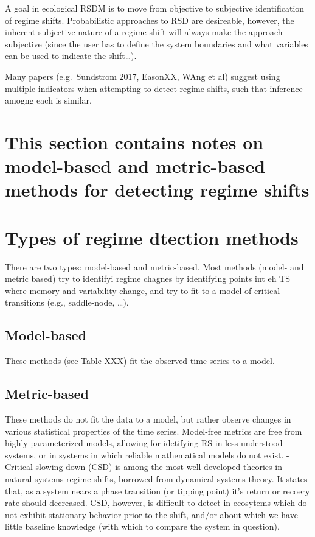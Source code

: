 \documentclass[12pt,twoside,openany]{reedthesis}
\begin{document}
A goal in ecological RSDM is to move from objective to subjective identification of regime shifts. Probabilistic approaches to RSD are desireable, however, the inherent subjective nature of a regime shift will always make the approach subjective (since the user has to define the system boundaries and what variables can be used to indicate the shift\ldots{}).

Many papers (e.g.~Sundstrom 2017, EasonXX, WAng et al) suggest using multiple indicators when attempting to detect regime shifts, such that inference amogng each is similar.

\hypertarget{this-section-contains-notes-on-model-based-and-metric-based-methods-for-detecting-regime-shifts}{%
\section{This section contains notes on model-based and metric-based methods for detecting regime shifts}\label{this-section-contains-notes-on-model-based-and-metric-based-methods-for-detecting-regime-shifts}}

\hypertarget{types-of-regime-dtection-methods}{%
\section{Types of regime dtection methods}\label{types-of-regime-dtection-methods}}

There are two types: model-based and metric-based. Most methods (model- and metric based) try to identifyi regime chagnes by identifying points int eh TS where memory and variability change, and try to fit to a model of critical transitions (e.g., saddle-node, \ldots{}).

\hypertarget{model-based}{%
\subsection{Model-based}\label{model-based}}

These methods (see Table XXX) fit the observed time series to a model.

\hypertarget{metric-based}{%
\subsection{Metric-based}\label{metric-based}}

These methods do not fit the data to a model, but rather observe changes in various statistical properties of the time series. Model-free metrics are free from highly-parameterized models, allowing for idetifying RS in less-understood systems, or in systems in which reliable mathematical models do not exist.
- Critical slowing down (CSD) is among the most well-developed theories in natural systems regime shifts, borrowed from dynamical systems theory. It states that, as a system nears a phase transition (or tipping point) it's return or recoery rate should decreased. CSD, however, is difficult to detect in ecosytems which do not exhibit stationary behavior prior to the shift, and/or about which we have little baseline knowledge (with which to compare the system in question).
\end{document}
